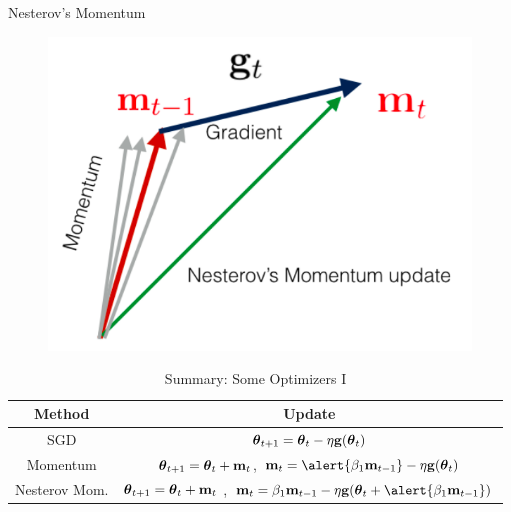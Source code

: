 \documentclass[xcolor=pdftex,dvipsnames,table,mathserif]{beamer}
\begin{document}
\begin{frame}{Nesterov's Momentum}
\begin{figure}
\includegraphics[width=.95\columnwidth]{../graphics/Nesterov}
\end{figure}
\end{frame}


\begin{frame}
\begin{table}[htp]
\caption{Summary: Some Optimizers I}
\begin{center}
\begin{tabular}{|c|c|} \hline
Method & Update\\ \hline
SGD  & $\boldsymbol{\theta}_{t+1}= \boldsymbol{\theta}_{t}-\eta\mathbf{g}(\boldsymbol{\theta}_{t})$ \\ \hline
Momentum    & $\boldsymbol{\theta}_{t+1}= \boldsymbol{\theta}_{t}+\mathbf{m}_t$, $\mathbf{m}_{t}= \alert{\beta_1 \mathbf{m}_{t-1}} -\eta \mathbf{g}(\param_{t}) $ \\  \hline
Nesterov Mom.  &  $\boldsymbol{\theta}_{t+1}= \boldsymbol{\theta}_{t}+\mathbf{m}_t$ , $\mathbf{m}_t= \beta_1 \mathbf{m}_{t-1} -\eta\mathbf{g}(\param_{t}+ \alert{\beta_1 \mathbf{m}_{t-1}}) $ \\ \hline
\end{tabular}
\end{center}
\label{default}
\end{table}%
\end{frame}
\end{document}
